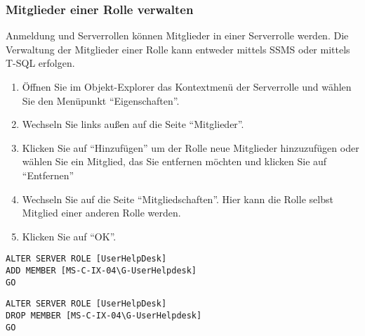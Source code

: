         \subsubsection{Mitglieder einer Rolle verwalten}
          Anmeldung und Serverrollen können Mitglieder in einer Serverrolle
          werden. Die Verwaltung der Mitglieder einer Rolle kann entweder
          mittels SSMS oder mittels T-SQL erfolgen.
          \begin{enumerate}
            \item Öffnen Sie im Objekt-Explorer das Kontextmenü der Serverrolle
            und wählen Sie den Menüpunkt \enquote{Eigenschaften}.
            \item Wechseln Sie links außen auf die Seite \enquote{Mitglieder}.
            \item Klicken Sie auf \enquote{Hinzufügen} um der Rolle neue
            Mitglieder hinzuzufügen oder wählen Sie ein Mitglied, das Sie
            entfernen möchten und klicken Sie auf \enquote{Entfernen}
            \item Wechseln Sie auf die Seite \enquote{Mitgliedschaften}. Hier
            kann die Rolle selbst Mitglied einer anderen Rolle werden.
            \item Klicken Sie auf \enquote{OK}.
          \end{enumerate}
          \begin{lstlisting}[language=ms_sql,caption={Hinzufügen
          von Mitgliedern zu einer Serverrolle},label=sql19_04]
ALTER SERVER ROLE [UserHelpDesk]
ADD MEMBER [MS-C-IX-04\G-UserHelpdesk]
GO
          \end{lstlisting}
          \begin{lstlisting}[language=ms_sql,caption={Entfernen
          von Mitgliedern aus einer Serverrolle},label=sql19_05]
ALTER SERVER ROLE [UserHelpDesk]
DROP MEMBER [MS-C-IX-04\G-UserHelpdesk]
GO
          \end{lstlisting}
          \begin{literaturinternet}
            \item \cite{ms189775}
          \end{literaturinternet}
